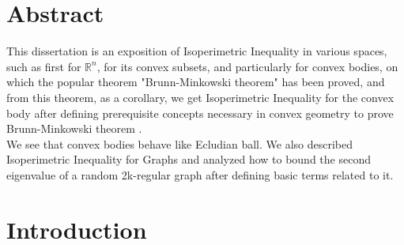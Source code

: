 \documentclass[oneside]{book}
\begin{document}
	\chapter*{Abstract}
	
	
	
	This dissertation is an exposition of Isoperimetric Inequality in various spaces, such as first for $\mathbb{R}^n$, for its convex subsets, and particularly for convex bodies, on which the popular theorem "Brunn-Minkowski theorem" has been proved, and from this theorem, as a corollary, we get  Isoperimetric Inequality for the convex body after defining prerequisite concepts necessary in convex geometry to prove Brunn-Minkowski theorem .\\
	We see that convex bodies behave like Ecludian ball.
	We also described Isoperimetric Inequality for Graphs and analyzed how to bound the second eigenvalue of a random 2k-regular graph after defining basic terms related to it. 
	
	
	
	
	
	
	
	
	
	
	
	
	
	
	
	
	
	
	
	
	
	
	
	
	
	
	
	
	
	
	
	
	
	
	
	
	
	
	
	
	
	
	
	
	
	
	
	
	
	
	
	
	
	
	
	
	
	
	
	
	\chapter{Introduction}
	\label{chap:c1}
	
\end{document}
